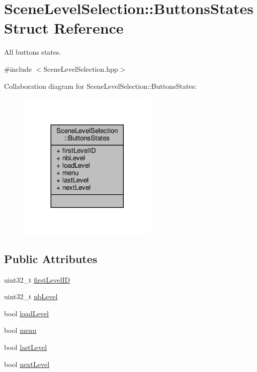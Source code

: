 \hypertarget{struct_scene_level_selection_1_1_buttons_states}{}\section{Scene\+Level\+Selection\+:\+:Buttons\+States Struct Reference}
\label{struct_scene_level_selection_1_1_buttons_states}


All buttons states.  




{\ttfamily \#include $<$Scene\+Level\+Selection.\+hpp$>$}



Collaboration diagram for Scene\+Level\+Selection\+:\+:Buttons\+States\+:
\nopagebreak
\begin{figure}[H]
\begin{center}
\leavevmode
\includegraphics[width=188pt]{struct_scene_level_selection_1_1_buttons_states__coll__graph}
\end{center}
\end{figure}
\subsection*{Public Attributes}
\begin{DoxyCompactItemize}
\item 
uint32\+\_\+t \hyperlink{struct_scene_level_selection_1_1_buttons_states_ad5dae3335f66dd93bd65153cd7465f4e}{first\+Level\+ID}
\item 
uint32\+\_\+t \hyperlink{struct_scene_level_selection_1_1_buttons_states_a0a628ace7937488fc961b18ce23cd622}{nb\+Level}
\item 
bool \hyperlink{struct_scene_level_selection_1_1_buttons_states_aab6f53d5523d24d763220bff9145dd6b}{load\+Level}
\item 
bool \hyperlink{struct_scene_level_selection_1_1_buttons_states_a57363bd7554b83d2233b457c71101aae}{menu}
\item 
bool \hyperlink{struct_scene_level_selection_1_1_buttons_states_acf37f26590be528e2fffe7b028170660}{last\+Level}
\item 
bool \hyperlink{struct_scene_level_selection_1_1_buttons_states_a9f5d5504cea6bb40837ec15734e712b1}{next\+Level}
\end{DoxyCompactItemize}


